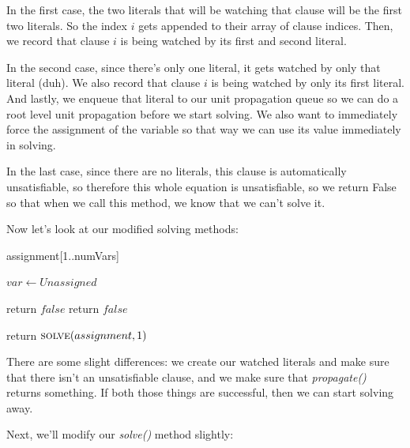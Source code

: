 In the first case, the two literals that will be watching that clause will be the 
first two literals. So the index $i$ gets appended to their array of clause indices.
Then, we record that clause $i$ is being watched by its first and second literal.

In the second case, since there's only one literal, it gets watched by only that 
literal (duh). We also record that clause $i$ is being watched by only its first literal.
And lastly, we enqueue that literal to our unit propagation queue so we can do a root 
level unit propagation before we start solving. We also want to immediately force the 
assignment of the variable so that way we can use its value immediately in solving.

In the last case, since there are no literals, this clause is automatically unsatisfiable, 
so therefore this whole equation is unsatisfiable, so we return False so that when we call 
this method, we know that we can't solve it. 

Now let's look at our modified solving methods:

\begin{algorithm}[H]
\caption{Modified Setup}\label{alg:17}
\begin{algorithmic}[1]


\State assignment[1..numVars]

    \State $var \gets Unassigned$
\EndFor

    \State return $false$
    \State return $false$
\EndIf

\State return $\Call{solve}{assignment, 1}$

\EndProcedure
\end{algorithmic}
\end{algorithm}

There are some slight differences: we create our watched literals and make sure 
that there isn't an unsatisfiable clause, and we make sure that \textit{propagate()}
returns something. If both those things are successful, then we can start solving away.

Next, we'll modify our \textit{solve()} method slightly:

